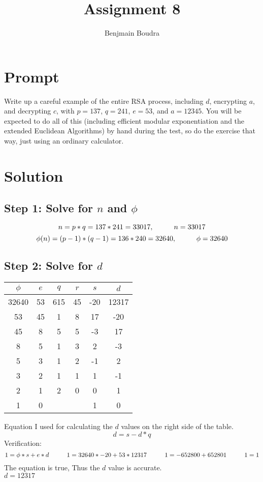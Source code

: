 \documentclass{Algorithms}
\title{Assignment 8}
\author{Benjmain Boudra}
\begin{document}
\maketitle
\tableofcontents
\section{Prompt}
Write up a careful example of the entire RSA process, including $d$, encrypting $a$, and decrypting $c$, with $p = 137$, $q = 241$, $e = 53$, and $a = 12345$. You will be expected to do all of this (including efficient modular exponentiation and the extended Euclidean Algorithms) by hand during the test, so do the exercise that way, just using an ordinary calculator.
\section{Solution}
\subsection{Step 1: Solve for $n$ and $\phi$}
\begin{equation*}
  n = p*q = 137 * 241 = 33017, \hspace*{1cm} n = 33017
\end{equation*}
\begin{equation*}
  \phi(n) = (p-1) * (q-1) = 136 * 240 = 32640, \hspace*{1cm} \phi = 32640
\end{equation*}
\subsection{Step 2: Solve for $d$}
\begin{tabular}{c|c|c|c|c|c}
  $\phi$ & $e$ & $q$ & $r$ & $s$ & $d$ \\ \hline
  32640 & 53 & 615 & 45 & -20 & 12317\\
  53 & 45 & 1 & 8 & 17 & -20\\
  45 & 8 & 5 & 5 & -3 & 17\\
  8 & 5 & 1 & 3 & 2 & -3\\
  5 & 3 & 1 & 2 & -1 & 2\\
  3 & 2 & 1 & 1 & 1 & -1\\
  2 & 1 & 2 & 0 & 0 & 1\\
  1 & 0 & &  & 1 & 0

\end{tabular}

Equation I used for calculating the $d$ values on the right side of the table.
\begin{equation*}
  d = s - d * q
\end{equation*}
Verification:
\begin{equation*}
  1 = \phi * s + e * d \hspace*{1cm} 1 = 32640 * -20 + 53 * 12317 \hspace*{1cm} 1 = -652800 + 652801 \hspace*{1cm} 1 = 1
\end{equation*}
The equation is true, Thus the $d$ value is accurate.\\
$d = 12317$
\end{document}
